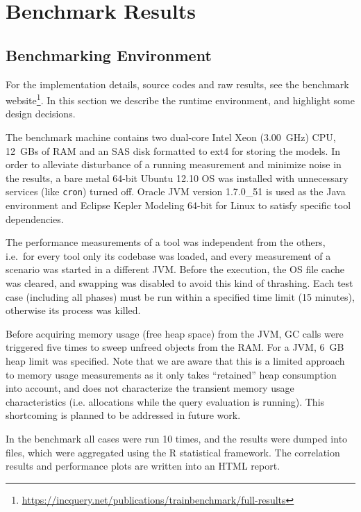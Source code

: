 \chapter{Benchmark Results}


\section{Benchmarking Environment}
\label{sec:environment}

For the implementation details, source codes and raw results, see the benchmark website\footnote{\url{https://incquery.net/publications/trainbenchmark/full-results}}. In this section we describe the runtime environment, and highlight some design decisions.

The benchmark machine contains two dual-core Intel Xeon (3.00~GHz) CPU, 12~GBs of RAM and an SAS disk formatted to ext4 for storing the models. In order to alleviate disturbance of a running measurement and minimize noise in the results, a bare metal 64-bit Ubuntu 12.10 OS was installed with unnecessary services (like \texttt{cron}) turned off. Oracle JVM version 1.7.0\_51 is used as the Java environment and Eclipse Kepler Modeling 64-bit for Linux to satisfy specific tool dependencies.

The performance measurements of a tool was independent from the others, i.e.\ for every tool only its codebase was loaded, and every measurement of a scenario was started in a different JVM. Before the execution, the OS file cache was cleared, and swapping was disabled to avoid this kind of thrashing. Each test case (including all phases) must be run within a specified time limit (15 minutes), otherwise its process was killed.

Before acquiring memory usage (free heap space) from the JVM, GC calls were triggered five times to sweep unfreed objects from the RAM. For a JVM, 6~GB heap limit was specified. Note that we are aware that this is a limited approach to memory usage measurements as it only takes ``retained'' heap consumption into account, and does not characterize the transient memory usage characteristics (i.e. allocations while the query evaluation is running). This shortcoming is planned to be addressed in future work.

In the benchmark all cases were run 10 times, and the results were dumped into files, which were aggregated using the R statistical framework. The correlation results and performance plots are written into an HTML report.


